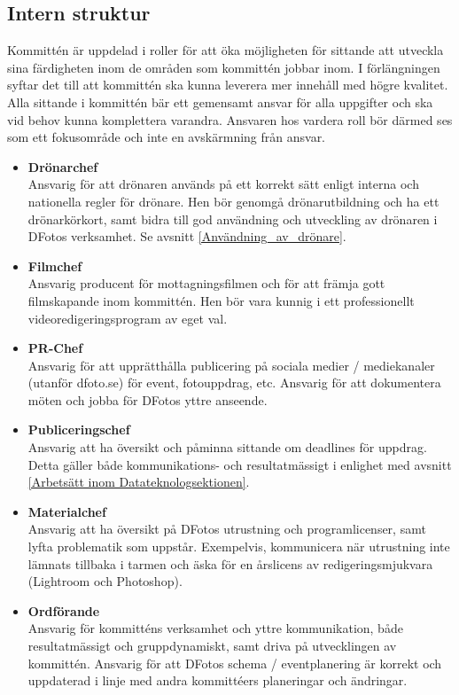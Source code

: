 \subsection{Intern struktur}
\label{Rollerbeskrivningar}
Kommittén är uppdelad i roller för att öka möjligheten för sittande att utveckla sina färdigheten inom de områden som kommittén jobbar inom. I förlängningen syftar det till att kommittén ska kunna leverera mer innehåll med högre kvalitet. Alla sittande i kommittén bär ett gemensamt ansvar för alla uppgifter och ska vid behov kunna komplettera varandra. Ansvaren hos vardera roll bör därmed ses som ett fokusområde och inte en avskärmning från ansvar.
\begin{itemize}
    
    \item \textbf{Drönarchef}\\
    Ansvarig för att drönaren används på ett korrekt sätt enligt interna och nationella regler för drönare. Hen bör genomgå drönarutbildning och ha ett drönarkörkort, samt bidra till god användning och utveckling av drönaren i DFotos verksamhet. Se avsnitt \ref{Användning_av_drönare}. 
    
    \item \textbf{Filmchef} \\
    Ansvarig producent för mottagningsfilmen och för att främja gott filmskapande inom kommittén. Hen bör vara kunnig i ett professionellt videoredigeringsprogram av eget val.
    
    \item \textbf{PR-Chef}\\
    Ansvarig för att upprätthålla publicering på sociala medier / mediekanaler (utanför dfoto.se) för event, fotouppdrag, etc. Ansvarig för att dokumentera möten och jobba för DFotos yttre anseende. 
    
    \item \textbf{Publiceringschef}\\
    Ansvarig att ha översikt och påminna sittande om deadlines för uppdrag. Detta gäller både kommunikations- och resultatmässigt i enlighet med avsnitt \ref{Arbetsätt inom Datateknologsektionen}. 
    
    \item \textbf{Materialchef}\\
    Ansvarig att ha översikt på DFotos utrustning och programlicenser, samt lyfta problematik som uppstår. 
    Exempelvis, kommunicera när utrustning inte lämnats tillbaka i tarmen och äska för en årslicens av redigeringsmjukvara (Lightroom och Photoshop).
    
    \item \textbf{Ordförande}\\
    Ansvarig för kommitténs verksamhet och yttre kommunikation, både resultatmässigt och gruppdynamiskt, samt driva på  utvecklingen av kommittén. Ansvarig för att DFotos schema / eventplanering är korrekt och uppdaterad i linje med andra kommittéers planeringar och ändringar.

\end{itemize}
